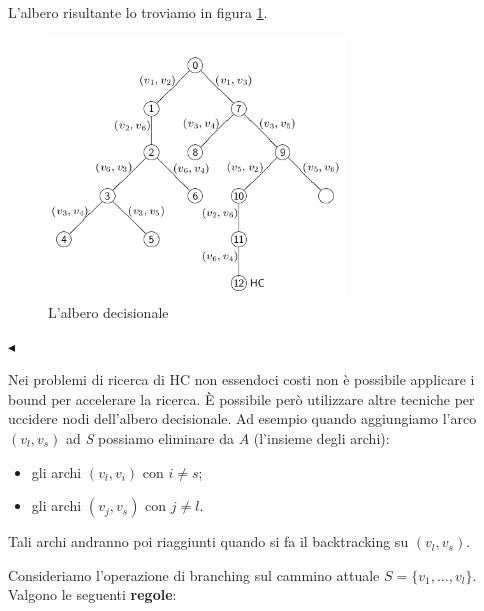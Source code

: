 \documentclass[11pt]{book}
\begin{document}
L'albero risultante lo troviamo in figura \ref{cap7hamilton2}.

\begin{figure}[H]
  \centering
  \includegraphics[width=0.7\textwidth]{images/cap7hamilton2.png}
  \caption{L'albero decisionale}
  \label{cap7hamilton2}
\end{figure}

$\blacktriangleleft$
\vspace{11pt}

Nei problemi di ricerca di HC non essendoci costi non \`e possibile
applicare i bound per accelerare la ricerca. \`E possibile per\`o
utilizzare altre tecniche per uccidere nodi dell'albero
decisionale. Ad esempio quando aggiungiamo l'arco $(v_l, v_s)$ ad {\em
  S} possiamo eliminare da $A$ (l'insieme degli archi):

\begin{itemize}
\item gli archi $(v_l,v_i)$ con $i\neq s$;
\item gli archi $(v_j,v_s)$ con $j\neq l$.
\end{itemize}

Tali archi andranno poi riaggiunti quando si fa il backtracking su
$(v_l,v_s)$.

Consideriamo l'operazione di branching sul cammino attuale $S =
\{v_1,\dots,v_l\}$. Valgono le seguenti {\bf regole}:
\end{document}
